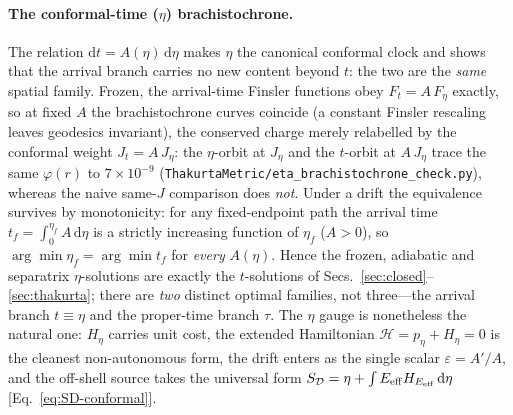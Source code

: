 \documentclass[12pt]{iopart}
\newcommand{\dd}{\mathrm{d}}
\begin{document}
\paragraph{The conformal-time ($\eta$) brachistochrone.} The relation
$\dd t=A(\eta)\,\dd\eta$ makes $\eta$ the canonical conformal clock and shows that the
arrival branch carries no new content beyond $t$: the two are the \emph{same} spatial
family. Frozen, the arrival-time Finsler functions obey $F_t=A\,F_\eta$ exactly, so at
fixed $A$ the brachistochrone curves coincide (a constant Finsler rescaling leaves
geodesics invariant), the conserved charge merely relabelled by the conformal weight
$J_t=A\,J_\eta$: the $\eta$-orbit at $J_\eta$ and the $t$-orbit at $A\,J_\eta$ trace the
same $\varphi(r)$ to $7\times10^{-9}$
(\texttt{ThakurtaMetric/eta\_brachistochrone\_check.py}), whereas the naive same-$J$
comparison does \emph{not}. Under a drift the equivalence survives by monotonicity: for
any fixed-endpoint path the arrival time $t_f=\int_0^{\eta_f}A\,\dd\eta$ is a strictly
increasing function of $\eta_f$ ($A>0$), so $\arg\min\eta_f=\arg\min t_f$ for
\emph{every} $A(\eta)$. Hence the frozen, adiabatic and separatrix $\eta$-solutions are
exactly the $t$-solutions of Secs.~\ref{sec:closed}--\ref{sec:thakurta}; there are
\emph{two} distinct optimal families, not three---the arrival branch $t\equiv\eta$ and
the proper-time branch $\tau$. The $\eta$ gauge is nonetheless the natural one: $H_\eta$
carries unit cost, the extended Hamiltonian $\mathcal H=p_\eta+H_\eta=0$ is the cleanest
non-autonomous form, the drift enters as the single scalar $\varepsilon=A'/A$, and the
off-shell source takes the universal form $S_{\mathcal D}=\eta+\int E_{\rm eff}
H_{E_{\rm eff}}\,\dd\eta$ [Eq.~\eqref{eq:SD-conformal}].
\end{document}
